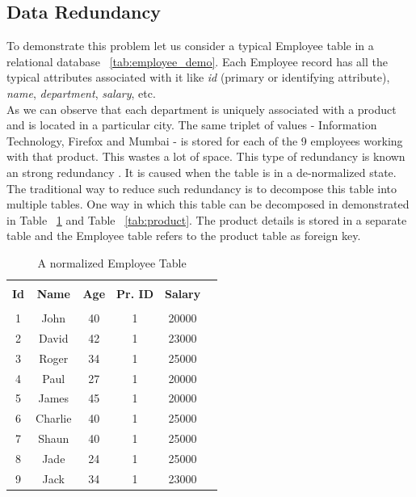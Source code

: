 \documentclass[12pt, oneside]{book}
\begin{document}
\subsection{Data Redundancy}
To demonstrate this problem let us consider a typical Employee table in a relational database ~\ref{tab:employee_demo}. Each Employee record has all the typical attributes associated with it like \emph{id} (primary or identifying attribute), \emph{name}, \emph{department}, \emph{salary}, etc. \\
As we can observe that each department is uniquely associated with a product and is located in a particular city. The same triplet of values - Information Technology, Firefox and Mumbai - is stored for each of the 9 employees working with that product. This wastes a lot of space. This type of redundancy is known an strong redundancy \cite{redundancy}. It is caused when the table is in a de-normalized state. The traditional way to reduce such redundancy is to decompose this table into multiple tables. One way in which this table can be decomposed in demonstrated in Table ~\ref{tab:emp_normal} and Table ~\ref{tab:product}. The product details is stored in a separate table and the Employee table refers to the product table as foreign key.

\begin{table}
    \centering
    \begin{tabular}{| c | c | c | c | c | @{}m{0pt}@{}}
    \hline
    \multicolumn{1}{|c|}{} & \multicolumn{1}{c|}{} & \multicolumn{1}{c|}{} & \multicolumn{1}{c|}{} & \multicolumn{1}{c|}{} &  \\
    \multicolumn{1}{|c|}{\textbf{Id}} & \multicolumn{1}{c|}{\textbf{Name}} & \multicolumn{1}{c|}{\textbf{Age}} & \multicolumn{1}{c|}{\textbf{Pr. ID}} & \multicolumn{1}{c|}{\textbf{Salary}} & \\
    \multicolumn{1}{|c|}{} & \multicolumn{1}{c|}{} & \multicolumn{1}{c|}{} & \multicolumn{1}{c|}{} & \multicolumn{1}{c|}{} &  \\
    \hline
    1 & John & 40 & 1 & 20000 & \\ [1ex] \hline
    2 & David & 42 & 1 & 23000 & \\ [1ex] \hline
    3 & Roger & 34 & 1 & 25000 & \\ [1ex] \hline
    4 & Paul & 27 & 1 & 20000 & \\ [1ex] \hline
    5 & James & 45 & 1 & 20000 & \\ [1ex] \hline
    6 & Charlie & 40 & 1 & 25000 & \\ [1ex] \hline
    7 & Shaun & 40 & 1 & 25000 & \\ [1ex] \hline
    8 & Jade & 24 & 1 & 25000 & \\ [1ex] \hline
    9 & Jack & 34 & 1 & 23000 & \\ [1ex] \hline
    \end{tabular}
    \caption{A normalized Employee Table}
    \label{tab:emp_normal}
\end{table}
\end{document}
